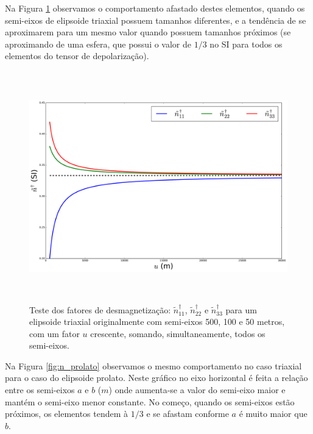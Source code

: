 Na Figura \ref{fig:n_triaxial} observamos o comportamento afastado destes elementos, quando os semi-eixos de elipsoide triaxial possuem tamanhos diferentes, e a tendência de se aproximarem para um mesmo valor quando possuem tamanhos próximos (se aproximando de uma esfera, que possui o valor de $1/3$ no SI para todos os elementos do tensor de depolarização).

\begin{figure}[hbt!]
	\centering \includegraphics[width=15cm,height=10cm]{figures/test_n_triaxial}
	\caption[Teste dos fatores de desmagnetização para um elipsoide triaxial.]{Teste dos fatores de desmagnetização:
		$\tilde{n}^{\dagger}_{11}$, $\tilde{n}^{\dagger}_{22}$ e $\tilde{n}^{\dagger}_{33}$ 
		para um elipsoide triaxial originalmente com semi-eixos 500, 100 e 50 metros, com um fator $u$ crescente,
		somando, simultaneamente, todos os semi-eixos.}
	\label{fig:n_triaxial}
\end{figure}

Na Figura \ref{fig:n_prolato} observamos o mesmo comportamento no caso triaxial para o caso do elipsoide prolato. Neste gráfico no eixo horizontal é feita a relação entre os semi-eixos $a$ e $b$ ($m$) onde aumenta-se a valor do semi-eixo maior e mantém o semi-eixo menor constante. No começo, quando os semi-eixos estão próximos, os elementos tendem à $1/3$ e se afastam conforme $a$ é muito maior que $b$.

